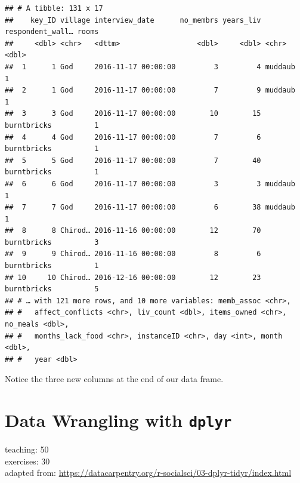 \documentclass[]{book}
\newenvironment{Shaded}{\begin{snugshade}}{\end{snugshade}}
\newcommand{\KeywordTok}[1]{\textcolor[rgb]{0.13,0.29,0.53}{\textbf{#1}}}
\newcommand{\StringTok}[1]{\textcolor[rgb]{0.31,0.60,0.02}{#1}}
\newcommand{\OperatorTok}[1]{\textcolor[rgb]{0.81,0.36,0.00}{\textbf{#1}}}
\newcommand{\NormalTok}[1]{#1}
\begin{document}
\begin{Shaded}
\end{Shaded}

\begin{verbatim}
## # A tibble: 131 x 17
##    key_ID village interview_date      no_membrs years_liv respondent_wall… rooms
##     <dbl> <chr>   <dttm>                  <dbl>     <dbl> <chr>            <dbl>
##  1      1 God     2016-11-17 00:00:00         3         4 muddaub              1
##  2      1 God     2016-11-17 00:00:00         7         9 muddaub              1
##  3      3 God     2016-11-17 00:00:00        10        15 burntbricks          1
##  4      4 God     2016-11-17 00:00:00         7         6 burntbricks          1
##  5      5 God     2016-11-17 00:00:00         7        40 burntbricks          1
##  6      6 God     2016-11-17 00:00:00         3         3 muddaub              1
##  7      7 God     2016-11-17 00:00:00         6        38 muddaub              1
##  8      8 Chirod… 2016-11-16 00:00:00        12        70 burntbricks          3
##  9      9 Chirod… 2016-11-16 00:00:00         8         6 burntbricks          1
## 10     10 Chirod… 2016-12-16 00:00:00        12        23 burntbricks          5
## # … with 121 more rows, and 10 more variables: memb_assoc <chr>,
## #   affect_conflicts <chr>, liv_count <dbl>, items_owned <chr>, no_meals <dbl>,
## #   months_lack_food <chr>, instanceID <chr>, day <int>, month <dbl>,
## #   year <dbl>
\end{verbatim}

Notice the three new columns at the end of our data frame.

\chapter{\texorpdfstring{Data Wrangling with
\texttt{dplyr}}{Data Wrangling with dplyr}}\label{dplyr}

teaching: 50\\
exercises: 30\\
adapted from:
\url{https://datacarpentry.org/r-socialsci/03-dplyr-tidyr/index.html}
\end{document}
